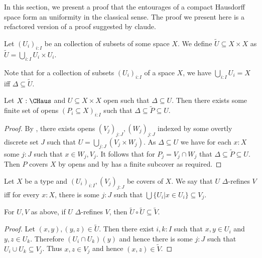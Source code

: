In this section, we present a proof that the entourages of a compact Hausdorff space form an uniformity in the classical sense. The proof we present here is a refactored version of a proof suggested by claude.

\begin{definition}
  Let $(U_i)_{i:I}$ be an collection of subsets of some space $X$. 
  We define $\widetilde U \subseteq X \times X$ as 
  $\widetilde U = \bigcup_{i:I} U_i \times U_i$. 
\end{definition}
\begin{remark}
  Note that for a collection of subsets $(U_i)_{i:I}$ of a space $X$, we have $\bigcup_{i:I} U_i = X$ iff $\Delta\subseteq \widetilde U$. 
\end{remark}

\begin{lemma}\label{openSquares}
  Let $X:\CHaus$ and $U\subseteq X \times X$ open such that $\Delta\subseteq U$. Then there exists some finite set of opens $(P_i\subseteq X)_{i:I}$ such that $\Delta \subseteq \widetilde P \subseteq U$.
\end{lemma}
\begin{proof}
  By , there exists opens $(V_j)_{j:J},(W_j)_{j:J}$ indexed by some overtly discrete set $J$ such that $U=\bigcup_{j:J} (V_j \times W_j)$. As $\Delta \subseteq U$ we have for each $x:X$ some $j:J$ such that $x\in W_j ,V_j$. 
  It follows that for $P_j = V_j \cap W_j$ that $\Delta \subseteq \widetilde P \subseteq U$. 
  Then $P$ covers $X$ by opens and by  has a finite subcover as required. 
\end{proof}

\begin{definition}
  Let $X$ be a type and $(U_i)_{i:I},(V_j)_{j:J}$ be covers of $X$. 
  We say that $U$ $\Delta$-refines $V$ iff for every $x:X$, there is some $j:J$ such that 
  $\bigcup\{U_i | x \in U_i\}  \subseteq V_j$. 
\end{definition}
\begin{lemma}
  For $U,V$ as above, if $U$ $\Delta$-refines $V$, then $\tilde U\circ \tilde U \subseteq \tilde V$. 
\end{lemma}
\begin{proof}
  Let $(x,y), (y,z) \in \widetilde U$. 
  Then there exist $i,k:I$ such that $x,y\in U_i$ and $y,z\in U_k$. 
  Therefore $(U_i \cap U_k)(y)$ and hence there is some $j:J$ such that $U_i \cup U_k \subseteq V_j$. 
  Thus $x, z \in V_j$ and hence $(x,z) \in \widetilde V$. 
\end{proof} 



